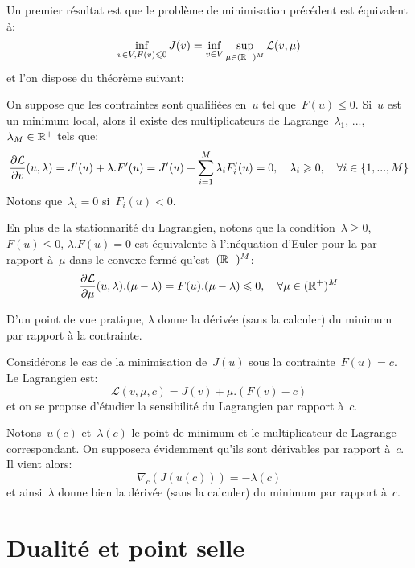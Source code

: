 \medskip
Un premier résultat est que le problème de minimisation précédent est équivalent à:
\begin{equation}
\inf_{v\in V, F(v)\leqslant0} J(v) = \inf_{v\in V} \sup_{\mu\in(\mathbb R^+)^M} \mathcal{L}(v,\mu)
\end{equation}
et l'on dispose du théorème suivant:
\begin{theoreme}
On suppose que les contraintes sont qualifiées en~$u$ tel que~$F(u)\le0$. Si~$u$ est un minimum local, alors il existe des multiplicateurs de Lagrange~$\lambda_1$, ..., $\lambda_M\in\mathbb R^+$ tels que:
\begin{equation}
\dfrac{\partial\mathcal{L}}{\partial v}(u,\lambda) = J'(u)+\lambda.F'(u)
= J'(u)+\displaystyle\sum_{i=1}^M\lambda_iF_i'(u) =0, \quad \lambda_i\geqslant0, 
\quad \forall i\in\{1, ..., M\}
\end{equation}
Notons que~$\lambda_i=0$ si~$F_i(u)<0$.

En plus de la stationnarité du Lagrangien, notons que la condition~$\lambda\ge0$, $F(u)\le 0$, $\lambda.F(u)=0$ est équivalente à l'inéquation d'Euler pour la  par rapport à~$\mu$ dans le convexe fermé qu'est~$(\mathbb R^+)^M$:
\begin{equation}
\dfrac{\partial\mathcal{L}}{\partial \mu}(u,\lambda).(\mu-\lambda)=F(u).(\mu-\lambda)\leqslant0, \quad \forall\mu\in(\mathbb R^+)^M
\end{equation}
\end{theoreme}

D'un point de vue pratique, $\lambda$ donne la dérivée (sans la calculer) du minimum par rapport à la contrainte.
\begin{demonstration}[Illustration]
Considérons le cas de la minimisation de~$J(u)$ sous la contrainte~$F(u)=c$.
Le Lagrangien est:
\[ \mathcal{L}(v,\mu,c)=J(v)+\mu.(F(v)-c) \]
et on se propose d'étudier la sensibilité du Lagrangien par rapport à~$c$.

Notons~$u(c)$ et~$\lambda(c)$ le point de minimum et le multiplicateur de Lagrange correspondant. On supposera évidemment qu'ils sont dérivables par rapport à~$c$. Il vient alors:
\[ \nabla_c\left(J(u(c))\right)=-\lambda(c) \]
et ainsi~$\lambda$ donne bien la dérivée (sans la calculer) du minimum par rapport à~$c$.
\end{demonstration}


\medskip
\section{Dualité et point selle}

